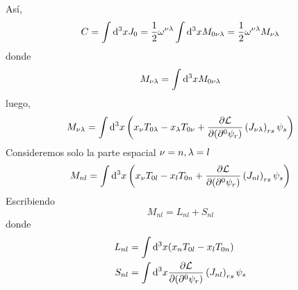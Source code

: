 Así,
\begin{align}
  C=\int\dd^3x J_0=\frac{1}{2}\omega^{\nu\lambda}\int\dd^3xM_{0\nu\lambda}=\frac{1}{2}\omega^{\nu\lambda}M_{\nu\lambda}
\end{align}
donde
\begin{equation}
  M_{\nu\lambda }=\int\dd^3xM_{0\nu\lambda}
\end{equation}
luego,
\begin{equation}
  M_{\nu\lambda}=\int\dd^3x\left(x_\nu T_{0\lambda}-x_\lambda T_{0\nu }+\pdv{\mathcal{L}}{(\partial^0\psi_r)}\left(J_{\nu\lambda}\right)_{rs}\psi_s\right)
\end{equation}
Consideremos solo la parte espacial $\nu =n,\lambda=l$
\begin{equation}
  M_{nl}=\int\dd^3x\left(x_\nu T_{0l}-x_l T_{0n }+\pdv{\mathcal{L}}{(\partial^0\psi_r)}\left(J_{nl}\right)_{rs}\psi_s\right)
\end{equation}
Escribiendo
\begin{equation}
  M_{nl}=L_{nl}+S_{nl}
\end{equation}
donde
\begin{align}
  L_{nl}&=\int\dd^3x(x_nT_{0l}-x_lT_{0n})\\
  S_{nl}&=\int\dd^3x\pdv{\mathcal{L}}{(\partial^0 \psi_r)}\left(J_{nl}\right)_{rs}\psi_s
\end{align}

